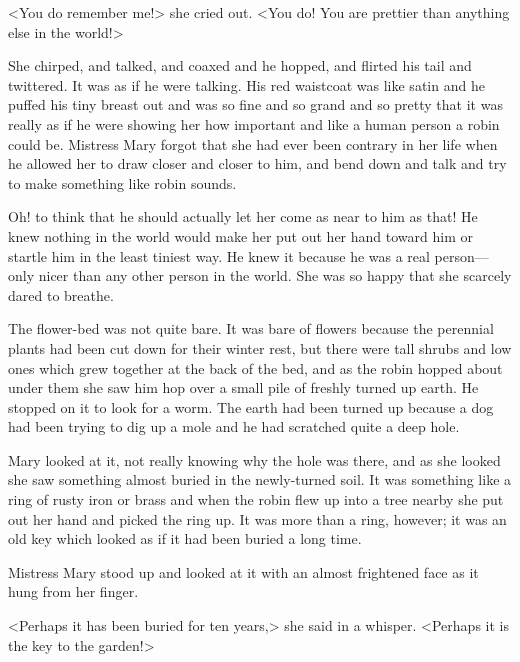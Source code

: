 <You do remember me!> she cried out. <You do! You are prettier than anything else in the world!>

She chirped, and talked, and coaxed and he hopped, and flirted his tail and twittered. It was as if he were talking. His red waistcoat was like satin and he puffed his tiny breast out and was so fine and so grand and so pretty that it was really as if he were showing her how important and like a human person a robin could be. Mistress Mary forgot that she had ever been contrary in her life when he allowed her to draw closer and closer to him, and bend down and talk and try to make something like robin sounds.

Oh! to think that he should actually let her come as near to him as that! He knew nothing in the world would make her put out her hand toward him or startle him in the least tiniest way. He knew it because he was a real person—only nicer than any other person in the world. She was so happy that she scarcely dared to breathe.

The flower-bed was not quite bare. It was bare of flowers because the perennial plants had been cut down for their winter rest, but there were tall shrubs and low ones which grew together at the back of the bed, and as the robin hopped about under them she saw him hop over a small pile of freshly turned up earth. He stopped on it to look for a worm. The earth had been turned up because a dog had been trying to dig up a mole and he had scratched quite a deep hole.

Mary looked at it, not really knowing why the hole was there, and as she looked she saw something almost buried in the newly-turned soil. It was something like a ring of rusty iron or brass and when the robin flew up into a tree nearby she put out her hand and picked the ring up. It was more than a ring, however; it was an old key which looked as if it had been buried a long time.

Mistress Mary stood up and looked at it with an almost frightened face as it hung from her finger.

<Perhaps it has been buried for ten years,> she said in a whisper. <Perhaps it is the key to the garden!>